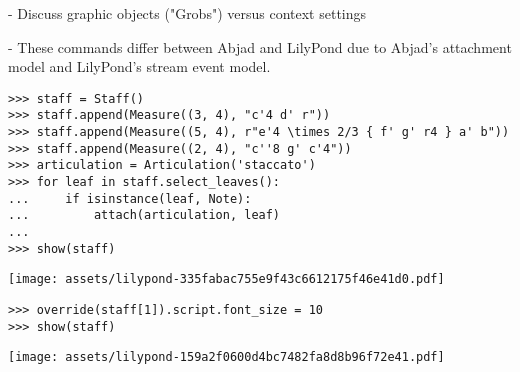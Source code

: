 -   Discuss graphic objects ("Grobs") versus context settings

-   These commands differ between Abjad and LilyPond due to Abjad's attachment
    model and LilyPond's stream event model.

\begin{comment}
<abjad>
staff = Staff()
staff.append(Measure((3, 4), "c'4 d' r"))
staff.append(Measure((5, 4), r"e'4 \times 2/3 { f' g' r4 } a' b"))
staff.append(Measure((2, 4), "c''8 g' c'4"))
articulation = Articulation('staccato')
for leaf in staff.select_leaves():
    if isinstance(leaf, Note):
        attach(articulation, leaf)

show(staff)
</abjad>
\end{comment}

\begin{abjadbookoutput}
\begin{singlespacing}
\vspace{-0.5\baselineskip}
\begin{lstlisting}
>>> staff = Staff()
>>> staff.append(Measure((3, 4), "c'4 d' r"))
>>> staff.append(Measure((5, 4), r"e'4 \times 2/3 { f' g' r4 } a' b"))
>>> staff.append(Measure((2, 4), "c''8 g' c'4"))
>>> articulation = Articulation('staccato')
>>> for leaf in staff.select_leaves():
...     if isinstance(leaf, Note):
...         attach(articulation, leaf)
...
>>> show(staff)
\end{lstlisting}
\noindent\texttt{[image: assets/lilypond-335fabac755e9f43c6612175f46e41d0.pdf]}
\end{singlespacing}
\end{abjadbookoutput}

\begin{comment}
<abjad>
override(staff[1]).script.font_size = 10
show(staff)
</abjad>
\end{comment}

\begin{abjadbookoutput}
\begin{singlespacing}
\vspace{-0.5\baselineskip}
\begin{lstlisting}
>>> override(staff[1]).script.font_size = 10
>>> show(staff)
\end{lstlisting}
\noindent\texttt{[image: assets/lilypond-159a2f0600d4bc7482fa8d8b96f72e41.pdf]}
\end{singlespacing}
\end{abjadbookoutput}

\begin{comment}
<abjad>
slur = spannertools.Slur(direction=Down)
attach(slur, staff.select_leaves()[1:-1])
override(slur).note_head.style = 'cross'
show(staff)
</abjad>
\end{comment}

